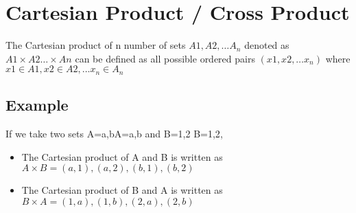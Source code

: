 \documentclass[12pt]{article}
\begin{document}
\section{Cartesian Product / Cross Product}


The Cartesian product of n number of sets $A1,A2,\ldots A_n$ denoted as $A1\times A2 \ldots \times An$ can be defined as all possible ordered pairs $(x1,x2,\ldots x_n)$
where $x1\in A1,x2\in A2,\ldots x_n \in A_n$

\subsection{Example}
If we take two sets A={a,b}A={a,b} and B={1,2}
B={1,2},

\begin{itemize}

\item The Cartesian product of A and B is written 
as  $A \times B={(a,1),(a,2),(b,1),(b,2)}$
\item The Cartesian product of B and A is written as  
$B\times A={(1,a),(1,b),(2,a),(2,b)}$
\end{itemize}
\end{document}
